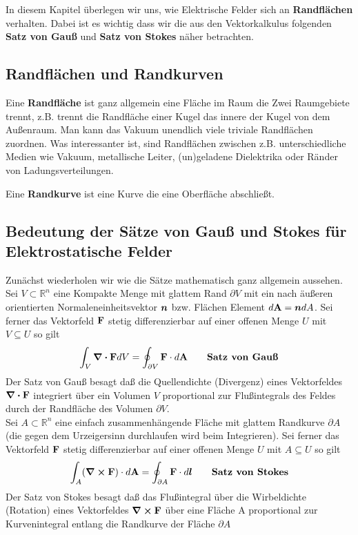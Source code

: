 In diesem Kapitel überlegen wir uns, wie Elektrische Felder sich an 
\textbf{Randflächen} verhalten. Dabei ist es wichtig dass wir die aus den
Vektorkalkulus folgenden \textbf{Satz von Gauß} und \textbf{Satz von Stokes}
näher betrachten.

\subsection{Randflächen und Randkurven}%

Eine \textbf{Randfläche} ist ganz allgemein eine Fläche im Raum die Zwei 
Raumgebiete trennt, z.B. trennt die Randfläche einer Kugel das innere der
Kugel von dem Außenraum. 
Man kann das Vakuum unendlich viele triviale Randflächen
zuordnen. Was interessanter ist, sind Randflächen zwischen z.B. 
unterschiedliche Medien wie Vakuum, metallische Leiter, (un)geladene 
Dielektrika oder Ränder von Ladungsverteilungen. 

Eine \textbf{Randkurve} ist eine Kurve die eine Oberfläche abschließt. 

\subsection{Bedeutung der Sätze von Gauß und Stokes für Elektrostatische 
Felder}%
Zunächst wiederholen wir wie die Sätze mathematisch ganz 
allgemein aussehen.\\

\noindent
Sei $V\subset \mathbb{R}^n$ eine Kompakte Menge mit glattem Rand 
$\partial V$ mit ein nach äußeren orientierten Normaleneinheitsvektor 
$\vb*n$ bzw. Flächen Element $d\vb A =  \vb*n dA$. Sei ferner das Vektorfeld
$\vb F$ stetig differenzierbar auf einer offenen Menge $U$ 
mit $V\subseteq U$ so gilt
\begin{equation}
  \int_V \div \vb FdV  = \oint_{\partial V} \vb F \cdot d\vb A 
  \qquad \textrm{\textbf{Satz von Gauß}}
\end{equation}
Der Satz von Gauß besagt daß die Quellendichte (Divergenz) eines 
Vektorfeldes $\div \vb F$
integriert über ein Volumen $V$ proportional zur Flußintegrals 
des Feldes durch der Randfläche des Volumen $\partial V$.\\

\noindent
Sei $A\subset \mathbb{R}^n$ eine einfach zusammenhängende Fläche mit
glattem Randkurve $\partial A$ (die gegen dem Urzeigersinn durchlaufen 
wird beim Integrieren). Sei ferner das Vektorfeld
$\vb F$ stetig differenzierbar auf einer offenen Menge $U$ 
mit $A\subseteq U$ so gilt
\begin{equation}
  \int_A (\curl \vb F) \cdot d\vb A= \oint_{\partial A} \vb F \cdot d\vb*l 
  \qquad \textrm{\textbf{Satz von Stokes}}
\end{equation}
Der Satz von Stokes besagt daß das Flußintegral über die Wirbeldichte 
(Rotation) eines
Vektorfeldes $\curl \vb F$ über eine Fläche A proportional zur 
Kurvenintegral entlang die Randkurve der Fläche $\partial A$

